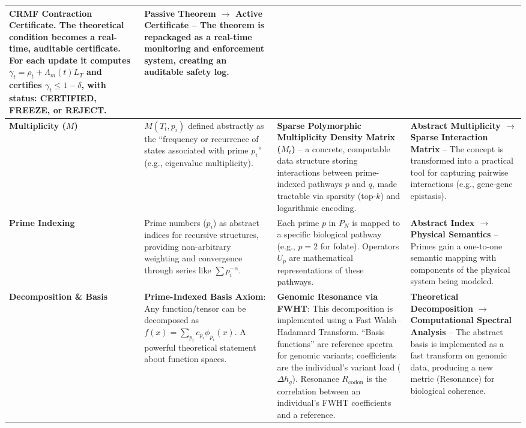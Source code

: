 \documentclass[12pt]{article}
\begin{document}
\begin{table}[h!]
\begin{tabular}{|p{3.2cm}|p{4cm}|p{4cm}|p{3cm}|}
\textbf{CRMF Contraction Certificate}. The theoretical condition becomes a real-time, auditable certificate. For each update it computes $\gamma_t = \rho_t + \Lambda_m(t)L_T$ and certifies $\gamma_t \leq 1-\delta$, with status: CERTIFIED, FREEZE, or REJECT. &
\textbf{Passive Theorem $\rightarrow$ Active Certificate} – The theorem is repackaged as a real-time monitoring and enforcement system, creating an auditable safety log. \\
\hline
\textbf{Multiplicity ($M$)} &
$M(T_t,p_i)$ defined abstractly as the “frequency or recurrence of states associated with prime $p_i$” (e.g., eigenvalue multiplicity). &
\textbf{Sparse Polymorphic Multiplicity Density Matrix ($M_t$)} – a concrete, computable data structure storing interactions between prime-indexed pathways $p$ and $q$, made tractable via sparsity (top-$k$) and logarithmic encoding. &
\textbf{Abstract Multiplicity $\rightarrow$ Sparse Interaction Matrix} – The concept is transformed into a practical tool for capturing pairwise interactions (e.g., gene-gene epistasis). \\
\hline
\textbf{Prime Indexing} &
Prime numbers ($p_i$) as abstract indices for recursive structures, providing non-arbitrary weighting and convergence through series like $\sum p_i^{-\alpha}$. &
Each prime $p$ in $P_N$ is mapped to a specific biological pathway (e.g., $p=2$ for folate). Operators $U_p$ are mathematical representations of these pathways. &
\textbf{Abstract Index $\rightarrow$ Physical Semantics} – Primes gain a one-to-one semantic mapping with components of the physical system being modeled. \\
\hline
\textbf{Decomposition \& Basis} &
\textbf{Prime-Indexed Basis Axiom}: Any function/tensor can be decomposed as $f(x) = \sum_{p_i} c_{p_i} \phi_{p_i}(x)$. A powerful theoretical statement about function spaces. &
\textbf{Genomic Resonance via FWHT}: This decomposition is implemented using a Fast Walsh–Hadamard Transform. “Basis functions” are reference spectra for genomic variants; coefficients are the individual’s variant load ($\Delta h_g$). Resonance $R_{\text{codon}}$ is the correlation between an individual's FWHT coefficients and a reference. &
\textbf{Theoretical Decomposition $\rightarrow$ Computational Spectral Analysis} – The abstract basis is implemented as a fast transform on genomic data, producing a new metric (Resonance) for biological coherence. \\
\hline
\end{tabular}
\end{table}
\end{document}

